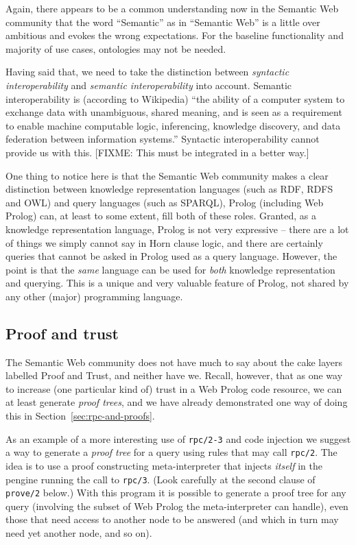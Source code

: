 \documentclass{tlp}
\begin{document}
Again, there appears to be a common understanding now in the Semantic Web community that the word ``Semantic'' as in ``Semantic Web'' is a little over ambitious and evokes the wrong expectations. For the baseline functionality and majority of use cases, ontologies may not be needed. 

Having said that, we need to take the distinction between \textit{syntactic interoperability} and \textit{semantic interoperability} into account. Semantic interoperability is (according to Wikipedia) ``the ability of a computer system to exchange data with unambiguous, shared meaning, and is seen as a requirement to enable machine computable logic, inferencing, knowledge discovery, and data federation between information systems.'' Syntactic interoperability cannot provide us with this. [FIXME: This must be integrated in a better way.]

One thing to notice here is that the Semantic Web community makes a clear distinction between knowledge representation languages (such as RDF, RDFS and OWL) and query languages (such as SPARQL), Prolog (including Web Prolog) can, at least to some extent, fill both of these roles. Granted, as a knowledge representation language, Prolog is not very expressive -- there are a lot of things we simply cannot say in Horn clause logic, and there are certainly queries that cannot be asked in Prolog used as a query language. However, the point is that the \textit{same} language can be used for \textit{both} knowledge representation and querying. This is a unique and very valuable feature of Prolog, not shared by any other (major) programming language. 


\subsection{Proof and trust}\label{sec:proof-and-trust}

\noindent The Semantic Web community does not have much to say about the cake layers labelled Proof and Trust, and neither have we. Recall, however, that as one way to increase (one particular kind of) trust in a Web Prolog code resource, we can at least generate \textit{proof trees}, and we have already demonstrated one way of doing this in Section~\ref{sec:rpc-and-proofs}. 

As an example of a more interesting use of \texttt{rpc/2-3} and code injection we suggest a way to generate a \textit{proof tree} for a query using rules that may call \texttt{rpc/2}. The idea is to use a proof constructing meta-interpreter that injects \emph{itself} in the pengine running the call to \texttt{rpc/3}. (Look carefully at the second clause of \texttt{prove/2} below.) With this program it is possible to generate a proof tree for any query (involving the subset of Web Prolog the meta-interpreter can handle), even those that need access to another node to be answered (and which in turn may need yet another node, and so on).
\end{document}
